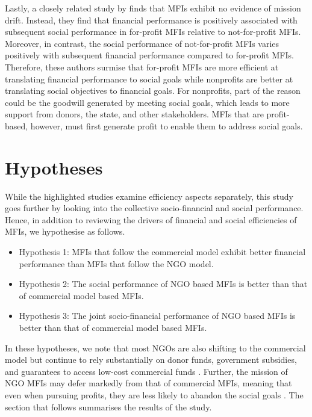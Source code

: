 \documentclass[a4paper, nobind]{templates/ociamthesis}
\providecommand{\tightlist}{%
  \setlength{\itemsep}{0pt}\setlength{\parskip}{0pt}}
\begin{document}
Lastly, a closely related study by \textcite{lam2020reciprocity} finds that MFIs exhibit no evidence of mission drift. Instead, they find that financial performance is positively associated with subsequent social performance in for-profit MFIs relative to not-for-profit MFIs. Moreover, in contrast, the social performance of not-for-profit MFIs varies positively with subsequent financial performance compared to for-profit MFIs. Therefore, these authors surmise that for-profit MFIs are more efficient at translating financial performance to social goals while nonprofits are better at translating social objectives to financial goals. For nonprofits, part of the reason could be the goodwill generated by meeting social goals, which leads to more support from donors, the state, and other stakeholders. MFIs that are profit-based, however, must first generate profit to enable them to address social goals.

\hypertarget{hypotheses}{%
\section{Hypotheses}\label{hypotheses}}

While the highlighted studies examine efficiency aspects separately, this study goes further by looking into the collective socio-financial and social performance. Hence, in addition to reviewing the drivers of financial and social efficiencies of MFIs, we hypothesise as follows.

\begin{itemize}
\tightlist
\item
  Hypothesis 1: MFIs that follow the commercial model exhibit better financial performance than MFIs that follow the NGO model.
\item
  Hypothesis 2: The social performance of NGO based MFIs is better than that of commercial model based MFIs.
\item
  Hypothesis 3: The joint socio-financial performance of NGO based MFIs is better than that of commercial model based MFIs.
\end{itemize}

In these hypotheses, we note that most NGOs are also shifting to the commercial model but continue to rely substantially on donor funds, government subsidies, and guarantees to access low-cost commercial funds \autocite{d2013unsubsidized}. Further, the mission of NGO MFIs may defer markedly from that of commercial MFIs, meaning that even when pursuing profits, they are less likely to abandon the social goals \autocites{louis2013profit}[@][]{mersland2019social}. The section that follows summarises the results of the study.
\end{document}
